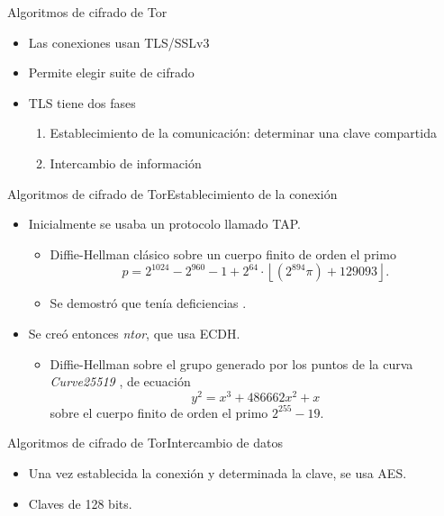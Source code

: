 \documentclass[spanish]{beamer}
\begin{document}
\begin{frame}{Algoritmos de cifrado de Tor}{}

  \begin{itemize}
    \item Las conexiones usan TLS/SSLv3

    \item Permite elegir suite de cifrado

    \item TLS tiene dos fases \begin{enumerate}
      \item Establecimiento de la comunicación: determinar una clave compartida
      \item Intercambio de información
    \end{enumerate}
  \end{itemize}

\end{frame}

\begin{frame}{Algoritmos de cifrado de Tor}{Establecimiento de la conexión}

  \begin{itemize}
    \item Inicialmente se usaba un protocolo llamado TAP. \begin{itemize}
      \item Diffie-Hellman clásico sobre un cuerpo finito de orden el primo \parencite{carrel_internet_1998} \[
        p = 2^{1024} - 2^{960} - 1 + 2^{64} \cdot \left\lfloor (2^{894} \pi) + 129093 \right\rfloor.
      \]
      \item Se demostró que tenía deficiencias \parencite{hutchison_security_2006}.
    \end{itemize}
    \item Se creó entonces \textit{ntor}, que usa ECDH. \begin{itemize}
      \item Diffie-Hellman sobre el grupo generado por los puntos de la curva \textit{Curve25519} \parencite{yung_curve25519:_2006}, de ecuación \[y^{2}=x^{3}+486662x^{2}+x\] sobre el cuerpo finito de orden el primo \(2^{255}-19\).
    \end{itemize}
  \end{itemize}

\end{frame}

\begin{frame}{Algoritmos de cifrado de Tor}{Intercambio de datos}

  \begin{itemize}
    \item Una vez establecida la conexión y determinada la clave, se usa AES.
    \item Claves de 128 bits.
  \end{itemize}

\end{frame}
\end{document}
